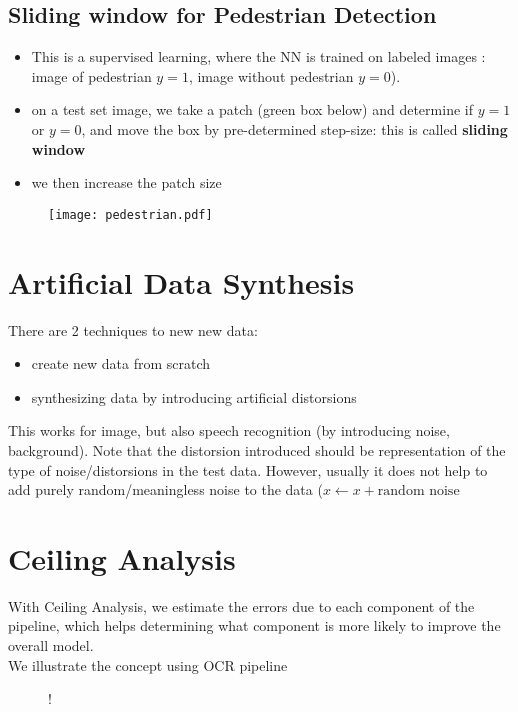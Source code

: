 \documentclass[a4paper,12pt]{report}
\begin{document}
\subsection{Sliding window for Pedestrian Detection}
\begin{itemize}
	\item This is a supervised learning, where the NN is trained on labeled images : image of pedestrian $y=1$, image without pedestrian $y=0$).
	\item on a test set image, we take a patch (green box below) and determine if $y=1$ or $y=0$, and move the box by pre-determined step-size: this is called \textbf{sliding window}
	\item we then increase the patch size
\end{itemize}
\begin{figure}[H]
\texttt{[image: pedestrian.pdf]}
\end{figure}

\section{Artificial Data Synthesis}
There are 2 techniques to new new data:
\begin{itemize}
\item create new data from scratch
\item synthesizing data by introducing artificial distorsions
\end{itemize}
This works for image, but also speech recognition (by introducing noise, background). Note that the distorsion introduced should be representation of the type of noise/distorsions in the test data. However, usually it does not help to add purely random/meaningless noise to the data ($x \leftarrow x + \text{random \ noise}$

\section{Ceiling Analysis}
With Ceiling Analysis, we estimate the errors due to each component of the pipeline, which helps determining what component is more likely to improve the overall model. \\

We illustrate the concept using OCR pipeline
\begin{figure}[H]
\resizebox {5in} {!} {
}
\end{figure}
\end{document}
